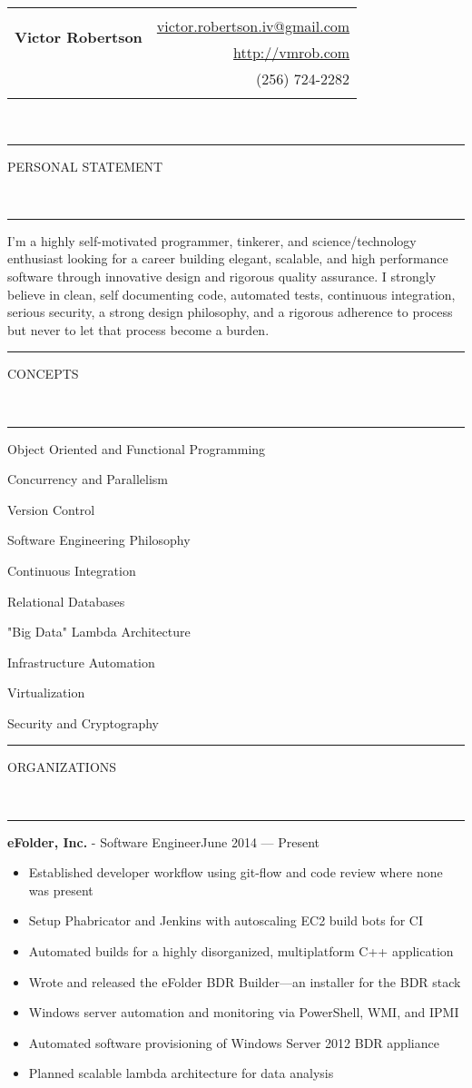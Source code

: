\documentclass[10pt, letterpaper, oneside]{article}
\makeatletter
\newcommand{\name}{Victor Robertson}
\newcommand{\website}{\href{http://vmrob.com}{http://vmrob.com}}
\newcommand{\phone}{(256) 724-2282}
\newcommand{\email}{\href{mailto:victor.robertson.iv@gmail.com}{victor.robertson.iv@gmail.com}}
\newcommand{\HRule}[2]{\textcolor{#1}{\rule{\linewidth}{#2}}}
\newcommand{\sectiontitle}[1]{\begin{minipage}{\textwidth}\HRule{black}{0.25mm}\vspace{-10pt}\begin{center}\Large\MakeUppercase{#1}\end{center}\end{minipage}\\\HRule{light-grey}{0.15mm}\vspace{\baselineskip}}
\newenvironment{ressection}[1]{
  \sectiontitle{#1}}
  {\vspace{0.5\baselineskip}}
\newenvironment{tightressection}[1]{
  \begin{minipage}{\textwidth}
  \sectiontitle{#1}}
  {\vspace{2\baselineskip}\end{minipage}}
\newenvironment{reslist}{
  \begin{minipage}{\textwidth}
    \begin{itemize}[noitemsep,nolistsep]}
  {\end{itemize}
    \end{minipage}}
\newcommand{\resitem}[1]{
    \vspace{2pt}
    \item \begin{flushleft} #1 \end{flushleft}
}
\newcommand{\resentryheader}[3]{
    \vspace{-5pt}
    \textbf{#1} - #2\hspace{\stretch{1}}\textcolor{light-grey}{#3}\\
}
\newenvironment{resentry}[3]{
  \begin{minipage}{\textwidth}
    \resentryheader{#1}{#2}{#3}
        \vspace{-\baselineskip}
    \begin{itemize}[noitemsep,nolistsep]
}{
    \end{itemize}
        \vspace{\baselineskip}
        \end{minipage}
}
\makeatother
\begin{document}
\begin{tabularx}{\linewidth}{X r}
\multirow{3}{*}{\Huge\textbf{\name}} & \\& \email \\& \website \\& \phone \\\\
\end{tabularx}\\

\begin{ressection}{Personal Statement}
    I'm a highly self-motivated programmer, tinkerer, and science/technology enthusiast looking for a career building elegant, scalable, and high performance software through innovative design and rigorous quality assurance. I strongly believe in clean, self documenting code, automated tests, continuous integration, serious security, a strong design philosophy, and a rigorous adherence to process but never to let that process become a burden.\\
\end{ressection}

\begin{tightressection}{Concepts}
  \begin{reslist}
  \begin{multicols}{2}
    \resitem{Object Oriented and Functional Programming}
    \resitem{Concurrency and Parallelism}
    \resitem{Version Control}
    \resitem{Software Engineering Philosophy}
    \resitem{Continuous Integration}
    \resitem{Relational Databases}
    \resitem{"Big Data" Lambda Architecture}
    \resitem{Infrastructure Automation}
    \resitem{Virtualization}
    \resitem{Security and Cryptography}
  \end{multicols}
  \end{reslist}
\end{tightressection}

\begin{ressection}{Organizations}
  \begin{resentry}{eFolder, Inc.}{Software Engineer}{June 2014 --- Present}
    \resitem{Established developer workflow using git-flow and code review where none was present}
    \resitem{Setup Phabricator and Jenkins with autoscaling EC2 build bots for CI}
    \resitem{Automated builds for a highly disorganized, multiplatform C++ application}
    \resitem{Wrote and released the eFolder BDR Builder---an installer for the BDR stack}
    \resitem{Windows server automation and monitoring via PowerShell, WMI, and IPMI}
    \resitem{Automated software provisioning of Windows Server 2012 BDR appliance}
    \resitem{Planned scalable lambda architecture for data analysis}
  \end{resentry}
\end{ressection}
\end{document}
